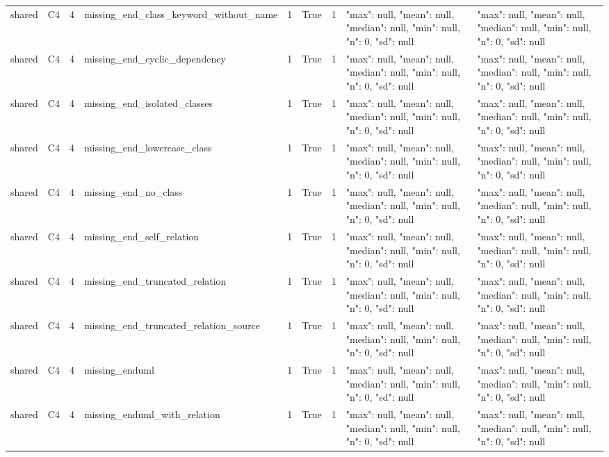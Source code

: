\begin{tabular}{lllllllll}
shared & C4 & 4 & missing\_end\_class\_keyword\_without\_name & 1 & True & 1 & {"max": null, "mean": null, "median": null, "min": null, "n": 0, "sd": null} & {"max": null, "mean": null, "median": null, "min": null, "n": 0, "sd": null} \\
shared & C4 & 4 & missing\_end\_cyclic\_dependency & 1 & True & 1 & {"max": null, "mean": null, "median": null, "min": null, "n": 0, "sd": null} & {"max": null, "mean": null, "median": null, "min": null, "n": 0, "sd": null} \\
shared & C4 & 4 & missing\_end\_isolated\_classes & 1 & True & 1 & {"max": null, "mean": null, "median": null, "min": null, "n": 0, "sd": null} & {"max": null, "mean": null, "median": null, "min": null, "n": 0, "sd": null} \\
shared & C4 & 4 & missing\_end\_lowercase\_class & 1 & True & 1 & {"max": null, "mean": null, "median": null, "min": null, "n": 0, "sd": null} & {"max": null, "mean": null, "median": null, "min": null, "n": 0, "sd": null} \\
shared & C4 & 4 & missing\_end\_no\_class & 1 & True & 1 & {"max": null, "mean": null, "median": null, "min": null, "n": 0, "sd": null} & {"max": null, "mean": null, "median": null, "min": null, "n": 0, "sd": null} \\
shared & C4 & 4 & missing\_end\_self\_relation & 1 & True & 1 & {"max": null, "mean": null, "median": null, "min": null, "n": 0, "sd": null} & {"max": null, "mean": null, "median": null, "min": null, "n": 0, "sd": null} \\
shared & C4 & 4 & missing\_end\_truncated\_relation & 1 & True & 1 & {"max": null, "mean": null, "median": null, "min": null, "n": 0, "sd": null} & {"max": null, "mean": null, "median": null, "min": null, "n": 0, "sd": null} \\
shared & C4 & 4 & missing\_end\_truncated\_relation\_source & 1 & True & 1 & {"max": null, "mean": null, "median": null, "min": null, "n": 0, "sd": null} & {"max": null, "mean": null, "median": null, "min": null, "n": 0, "sd": null} \\
shared & C4 & 4 & missing\_enduml & 1 & True & 1 & {"max": null, "mean": null, "median": null, "min": null, "n": 0, "sd": null} & {"max": null, "mean": null, "median": null, "min": null, "n": 0, "sd": null} \\
shared & C4 & 4 & missing\_enduml\_with\_relation & 1 & True & 1 & {"max": null, "mean": null, "median": null, "min": null, "n": 0, "sd": null} & {"max": null, "mean": null, "median": null, "min": null, "n": 0, "sd": null} \\

\end{tabular}
